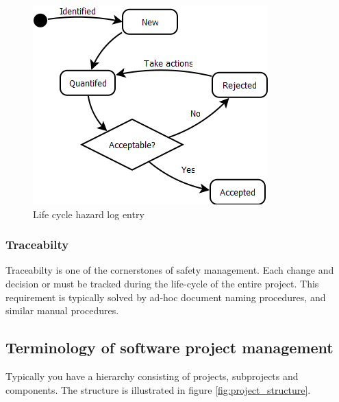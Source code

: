 \documentclass[10pt,a4paper]{article}
\begin{document}
\begin{figure}[h]
\centering
\includegraphics[scale=0.45]{fig/Hazard_log_Entry_Lifecycle.png} 
\caption{Life cycle hazard log entry}
\label{fig:hazard_log_life_cycle}
\end{figure}

\subsubsection{Traceabilty}
Traceabilty is one of the cornerstones of safety management. Each change and decision or must be tracked during the life-cycle of the entire project. This requirement is typically solved by ad-hoc document naming procedures, and similar manual procedures.

\subsection{Terminology of software project management}
Typically you have a hierarchy consisting of projects, subprojects and components. The structure is illustrated in figure \ref{fig:project_structure}.
\end{document}

